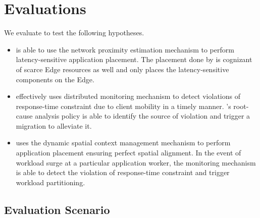\section{Evaluations}
\label{sec:oneedge_evals}
We evaluate \oneedge{} to test the following hypotheses.
\begin{itemize}
\item \oneedge{} is able to use the network proximity estimation mechanism to perform latency-sensitive application placement. The placement done by \oneedge{} is cognizant of scarce Edge resources as well and only places the latency-sensitive components on the Edge.
\item \oneedge{} effectively uses distributed monitoring mechanism to detect violations of response-time constraint due to client mobility in a timely manner. \oneedge{}'s root-cause analysis policy is able to identify the source of violation and trigger a migration to alleviate it.
\item \oneedge{} uses the dynamic spatial context management mechanism to perform application placement ensuring perfect spatial alignment. In the event of workload surge at a particular application worker, the monitoring mechanism is able to detect the violation of response-time constraint and trigger workload partitioning. 
\end{itemize}

\subsection{Evaluation Scenario}

